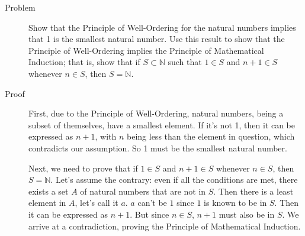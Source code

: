 \begin{description}
\item[Problem] Show that the Principle of Well-Ordering for the natural numbers
implies that 1 is the smallest natural number. Use this result to show that the
Principle of Well-Ordering implies the Principle of Mathematical Induction;
that is, show that if $S \subset \mathbb{N}$ such that $1 \in S$ and $n + 1 \in
S$ whenever $n \in S$, then $S = \mathbb{N}$.

\item[Proof] First, due to the Principle of Well-Ordering, natural numbers,
being a subset of themselves, have a smallest element. If it's not 1, then it
can be expressed as $n + 1$, with $n$ being less than the element in question,
which contradicts our assumption. So 1 must be the smallest natural number.

Next, we need to prove that if $1 \in S$ and $n + 1 \in S$ whenever $n \in S$,
then $S = \mathbb{N}$. Let's assume the contrary: even if all the conditions
are met, there exists a set $A$ of natural numbers that are not in $S$. Then
there is a least element in $A$, let's call it $a$. $a$ can't be $1$ since $1$
is known to be in $S$. Then it can be expressed as $n + 1$. But since $n \in
S$, $n + 1$ must also be in $S$. We arrive at a contradiction, proving the
Principle of Mathematical Induction.

\end{description}
